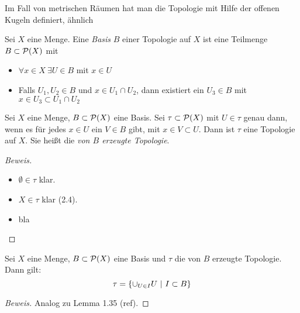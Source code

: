 Im Fall von metrischen Räumen hat man die Topologie mit Hilfe der offenen Kugeln
definiert, ähnlich\begin{dfn}
    Sei $X$ eine Menge. Eine \emph{Basis} $B$ einer Topologie auf $X$ ist eine
    Teilmenge $B\subset\mathcal{P}(X)$ mit
    \begin{itemize}
        \item $\forall x\in X\ \exists U\in B$ mit $x\in U$
        \item Falls $U_1,U_2\in B$ und $x\in U_1 \cap U_2$, dann existiert ein
            $U_3 \in B$ mit $x\in U_3 \subset U_1\cap U_2$
    \end{itemize}
\end{dfn}

\begin{stz}
    Sei $X$ eine Menge, $B\subset\mathcal{P}(X)$ eine Basis. Sei
    $\tau\subset\mathcal{P}(X)$ mit $U\in\tau$ genau dann, wenn es für jedes $x\in U$
    ein $V\in B$ gibt, mit $x\in V\subset U$. Dann ist $\tau$ eine Topologie auf $X$.
    Sie heißt die \emph{von $B$ erzeugte Topologie}.

    \begin{proof}[Beweis]
        \begin{itemize}
            \item $\emptyset\in\tau$ klar.
            \item $X\in\tau$ klar (2.4).
            \item bla
        \end{itemize}
    \end{proof}

\end{stz}

\begin{lem}
    Sei $X$ eine Menge, $B\subset\mathcal{P}(X)$ eine Basis und $\tau$ die von $B$
    erzeugte Topologie. Dann gilt: \[\tau = \mdef[\cup_{U\in I}U]{I\subset B}\]

    \begin{proof}[Beweis]
        Analog zu Lemma 1.35 (ref).
    \end{proof}
\end{lem}


